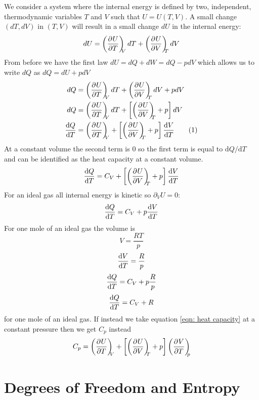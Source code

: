\documentclass{article}
\begin{document}
    We consider a system where the internal energy is defined by two, independent, thermodynamic variables \(T\) and \(V\) such that \(U = U(T, V)\).
    A small change \((dT, dV)\) in \((T, V)\) will result in a small change \(dU\) in the internal energy:
    \[dU = \left(\pdv[]{U}{T}\right)_{\!\!\!{V}}dT + \left(\pdv[]{U}{V}\right)_{\!\!\!{T}}dV\]
    From before we have the first law \(dU = dQ + dW = dQ - pdV\)
    which allows us to write \(dQ\) as \(dQ = dU + pdV\)
    \begin{align*}
        dQ &= \pdvconst{U}{T}{V}dT + \pdvconst{U}{V}{T}dV + pdV\\
        dQ &= \pdvconst{U}{T}{V}dT + \left[\pdvconst{U}{V}{T} + p\right]dV\\
        \dv{Q}{T} &= \pdvconst{U}{T}{V} + \left[\pdvconst{U}{V}{T} + p\right]\dv{V}{T}\stepcounter{equation}\tag{\theequation}\label{eqn: heat capacity}
    \end{align*}
    At a constant volume the second term is 0 so the first term is equal to \(\mathrm{d}Q/\mathrm{d}T\) and can be identified as the heat capacity at a constant volume.
    \[\dv{Q}{T} = C_V + \left[\left(\pdv[]{U}{V}\right)_{\!\!\!{T}} + p\right]\dv{V}{T}\]
    For an ideal gas all internal energy is kinetic so \(\partial_VU = 0\):
    \[\dv{Q}{T} = C_V + p\dv{V}{T}\]
    For one mole of an ideal gas the volume is
    \[V = \frac{RT}{p}\]
    \[\dv{V}{T} = \frac{R}{p}\]
    \[\dv{Q}{T} = C_V + p\frac{R}{p}\]
    \[\dv{Q}{T} = C_V + R\]
    for one mole of an ideal gas.
    If instead we take equation \ref{eqn: heat capacity} at a constant pressure then we get \(C_p\) instead
    \[C_p = \pdvconst{U}{T}{V} + \left[\pdvconst{U}{V}{T} + p\right]\pdvconst{V}{T}{p}\]
    
    \section{Degrees of Freedom and Entropy}
\end{document}
